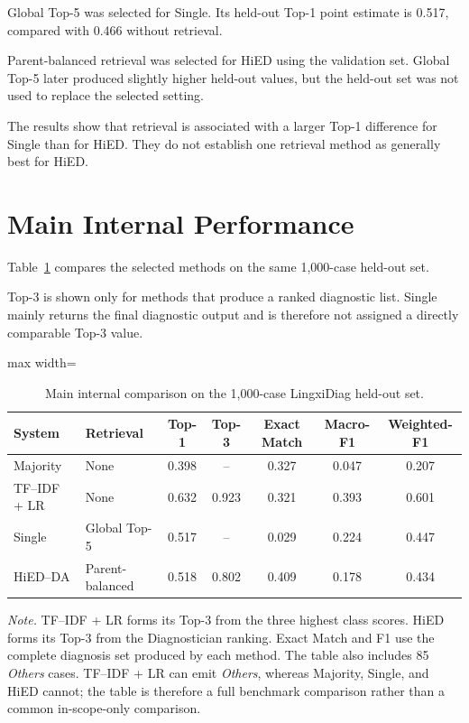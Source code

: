 \documentclass[12pt,a4paper,oneside]{report}
\begin{document}
Global Top-5 was selected for Single. Its held-out Top-1 point estimate
is 0.517, compared with 0.466 without retrieval.

Parent-balanced retrieval was selected for HiED using the validation
set. Global Top-5 later produced slightly higher held-out values, but
the held-out set was not used to replace the selected setting.

The results show that retrieval is associated with a larger Top-1
difference for Single than for HiED. They do not establish one retrieval
method as generally best for HiED.

\section{Main Internal Performance}
\label{sec:validation-retrieval-selection}
\label{sec:matched-baselines-retrieval}

Table~\ref{tab:matched-baselines-retrieval} compares the selected methods
on the same 1,000-case held-out set.

Top-3 is shown only for methods that produce a ranked diagnostic list.
Single mainly returns the final diagnostic output and is therefore not
assigned a directly comparable Top-3 value.

\begin{table}[H]
\centering
\caption{Main internal comparison on the 1,000-case LingxiDiag held-out
set.}
\label{tab:matched-baselines-retrieval}
\small
\begin{adjustbox}{max width=\textwidth}
\begin{tabular}{|l|l|c|c|c|c|c|}
\hline
\textbf{System} &
\textbf{Retrieval} &
\textbf{Top-1} &
\textbf{Top-3} &
\textbf{Exact Match} &
\textbf{Macro-F1} &
\textbf{Weighted-F1}\\
\hline
Majority & None & 0.398 & -- & 0.327 & 0.047 & 0.207\\
\hline
TF--IDF + LR & None & 0.632 & 0.923 & 0.321 & 0.393 & 0.601\\
\hline
Single & Global Top-5 & 0.517 & -- & 0.029 & 0.224 & 0.447\\
\hline
HiED--DA & Parent-balanced & 0.518 & 0.802 & 0.409 & 0.178 & 0.434\\
\hline
\end{tabular}
\end{adjustbox}

\parbox{0.96\textwidth}{\footnotesize
\textit{Note.} TF--IDF + LR forms its Top-3 from the three highest class
scores. HiED forms its Top-3 from the Diagnostician ranking. Exact Match
and F1 use the complete diagnosis set produced by each method. The table
also includes 85 \emph{Others} cases. TF--IDF + LR can emit
\emph{Others}, whereas Majority, Single, and HiED cannot; the table is
therefore a full benchmark comparison rather than a common in-scope-only
comparison.
}
\end{table}
\end{document}
